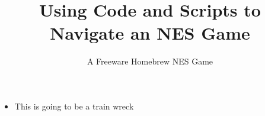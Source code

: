 \documentclass{beamer}
\title[]{Using Code and Scripts to Navigate an NES Game}
\subtitle{A Freeware Homebrew NES Game}
\author[]{}
\institute{}
\date{}
\begin{document}
\begin{frame}
	\titlepage
\end{frame}

\begin{frame}
	\begin{itemize}
		\item This is going to be a train wreck
	\end{itemize}
\end{frame}
\end{document}
